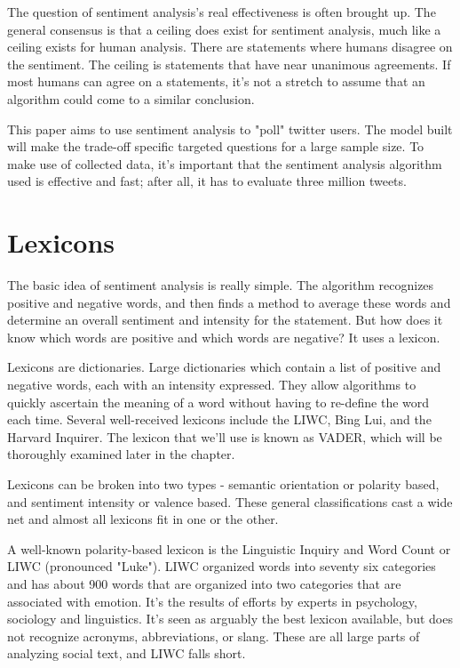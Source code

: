 \documentclass[11pt, twoside, reqno]{book}
\begin{document}
The question of sentiment analysis's real effectiveness is often brought up. The general consensus is that a ceiling does exist for sentiment analysis, much like a ceiling exists for human analysis. There are statements where humans disagree on the sentiment. The ceiling is statements that have near unanimous agreements. If most humans can agree on a statements, it's not a stretch to assume that an algorithm could come to a similar conclusion. 

This paper aims to use sentiment analysis to "poll" twitter users. The model built will make the trade-off specific targeted questions for a large sample size. To make use of collected data, it's important that the sentiment analysis algorithm used is effective and fast; after all, it has to evaluate three million tweets. 

\section{Lexicons}
\hspace{0.2in}The basic idea of sentiment analysis is really simple. The algorithm recognizes positive and negative words, and then finds a method to average these words and determine an overall sentiment and intensity for the statement. But how does it know which words are positive and which words are negative? It uses a lexicon. 

Lexicons are dictionaries. Large dictionaries which contain a list of positive and negative words, each with an intensity expressed. They allow algorithms to quickly ascertain the meaning of a word without having to re-define the word each time. Several well-received lexicons include the LIWC, Bing Lui, and the Harvard Inquirer. The lexicon that we'll use is known as VADER, which will be thoroughly examined later in the chapter. 

Lexicons can be broken into two types - semantic orientation or polarity based, and sentiment intensity or valence based. These general classifications cast a wide net and almost all lexicons fit in one or the other. 

 A well-known polarity-based lexicon is the Linguistic Inquiry and Word Count or LIWC (pronounced "Luke"). LIWC organized words into seventy six categories and has about 900 words that are organized into two categories that are associated with emotion. It's the results of efforts by experts in psychology, sociology and linguistics. It's seen as arguably the best lexicon available, but does not recognize acronyms, abbreviations, or slang. These are all large parts of analyzing social text, and LIWC falls short. 
\end{document}

